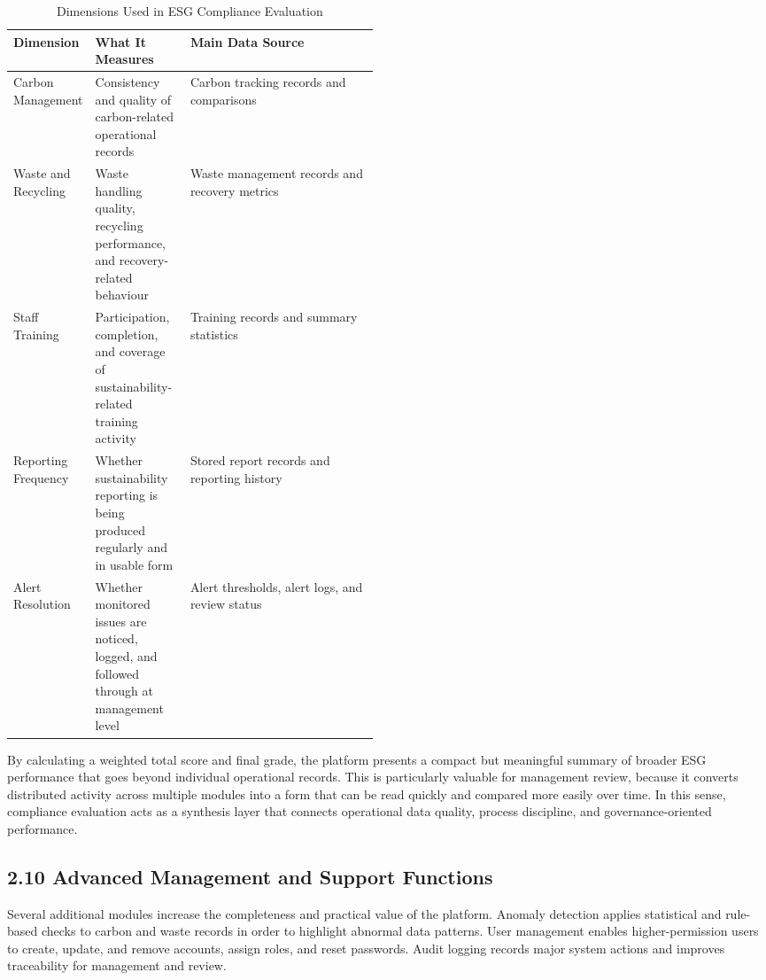 \documentclass[10pt,a4paper]{article}
\begin{document}
\begin{table}[h]
\centering
\scriptsize
\begin{tabularx}{\linewidth}{@{}p{0.22\linewidth}p{0.26\linewidth}X@{}}
\toprule
\textbf{Dimension} & \textbf{What It Measures} & \textbf{Main Data Source} \\
\midrule
Carbon Management & Consistency and quality of carbon-related operational records & Carbon tracking records and comparisons \\
Waste and Recycling & Waste handling quality, recycling performance, and recovery-related behaviour & Waste management records and recovery metrics \\
Staff Training & Participation, completion, and coverage of sustainability-related training activity & Training records and summary statistics \\
Reporting Frequency & Whether sustainability reporting is being produced regularly and in usable form & Stored report records and reporting history \\
Alert Resolution & Whether monitored issues are noticed, logged, and followed through at management level & Alert thresholds, alert logs, and review status \\
\bottomrule
\end{tabularx}
\caption{Dimensions Used in ESG Compliance Evaluation}
\end{table}

By calculating a weighted total score and final grade, the platform presents a compact but meaningful summary of broader ESG performance that goes beyond individual operational records. This is particularly valuable for management review, because it converts distributed activity across multiple modules into a form that can be read quickly and compared more easily over time. In this sense, compliance evaluation acts as a synthesis layer that connects operational data quality, process discipline, and governance-oriented performance.

\subsection*{2.10 Advanced Management and Support Functions}
Several additional modules increase the completeness and practical value of the platform. Anomaly detection applies statistical and rule-based checks to carbon and waste records in order to highlight abnormal data patterns. User management enables higher-permission users to create, update, and remove accounts, assign roles, and reset passwords. Audit logging records major system actions and improves traceability for management and review.
\end{document}
